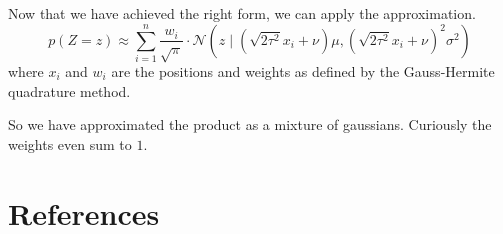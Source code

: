 \documentclass[11pt]{article}
\begin{document}
Now that we have achieved the right form, we can apply the approximation.
\begin{equation*}
  p(Z = z) \approx \sum_{i = 1}^{n} \frac{w_{i}}{\sqrt{\pi}} \cdot \mathcal{N}\left( z \mid \left(\sqrt{2 \tau^{2}} x_{i} + \nu\right)\mu, \left(\sqrt{2 \tau^{2}} x_{i} + \nu\right)^{2}\sigma^{2} \right)
\end{equation*}
where $x_{i}$ and $w_{i}$ are the positions and weights as defined by the
Gauss-Hermite quadrature method.

So we have approximated the product as a mixture of gaussians. Curiously the
weights even sum to $1$.

\section{References}

\printbibliography
\end{document}

